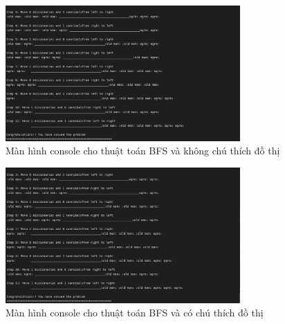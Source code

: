 \documentclass[a4paper, 11pt]{article}
\begin{document}
\begin{figure}[H]
    \centering
    \includegraphics[width=0.8\textwidth,height=0.8\textheight,keepaspectratio]{bfs_console.png}
    \caption{Màn hình console cho thuật toán BFS và không chú thích đồ thị}
\end{figure}

\begin{figure}[H]
    \centering
    \includegraphics[width=0.8\textwidth,height=0.8\textheight,keepaspectratio]{bfs_console_legend.png}
    \caption{Màn hình console cho thuật toán BFS và có chú thích đồ thị}
\end{figure}
\end{document}

